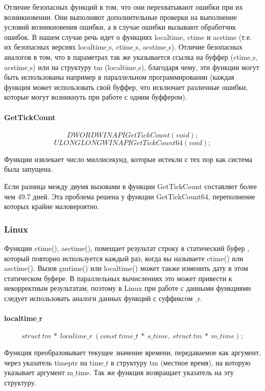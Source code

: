 \documentclass{article}
\begin{document}
			Отличие безопасных функций в том, что они перехватывают ошибки при их возникновении. Они выполняют дополнительные 				проверки на выполнение условий возникновения ошибки, а в случае ошибки вызывают обработчик ошибок. В нашем случае речь 				идет о функциях localtime, ctime и acstime (т.е. их безопасных версиях localtime$\_$s, ctime$\_$s, acstime$\_$s). Отличие 		безопасных аналогов в том, что в параметрах так же указывается ссылка на буффер (ctime$\_$s, acstime$\_$s) или на 					структуру tm (localtime$\_$s), благодаря чему, эти функции могут быть использованы например в параллельном 							программировании (каждая функция может использовать свой буффер, что исключает различные ошибки, которые могут возникнуть 		при работе с одним буффером).
					
			\paragraph*{GetTickCount}
			$$DWORD WINAPI GetTickCount(void);$$
			$$ULONGLONG WINAPI GetTickCount64(void);$$
			
			Функции извлекает число миллисекунд, которые истекли с тех пор как система была запущена. 
			
			Если разница между двумя вызовами в функции GetTickCount составляет более чем 49.7 дней. Эта проблема решена у 					функции GetTickCount64, переполнение которых крайне маловероятно.
			
		\subsubsection{Linux}	
			
			Функции ctime(), asctime(), помещает результат строку в статический буфер , который повторно используется каждый раз, 		когда вы называете ctime() или asctime(). Вызов gmtime() или localtime() может также изменить дату в этом статическом 				буфере. В параллельных вычислениях это может привести к некорректным результатам, поэтому в Linux при работе с данными 				функциями следует использовать аналоги данных функций с суффиксом $\_$r.
			\paragraph*{localtime$\_$r}
			$$struct~tm~*~localime\_r~(const~time\_t~*~s\_time,~struct~tm~*~m\_time);$$
			
				Функция преобразовывает текущее значение времени, передаваемое как аргумент, через указатель timeptr на time$\_t$ 			в структуру tm (местное время), на которую указывает аргумент m$\_$time. Так же функция возвращает указатель на эту 				структуру.	
	\newpage
\end{document}
